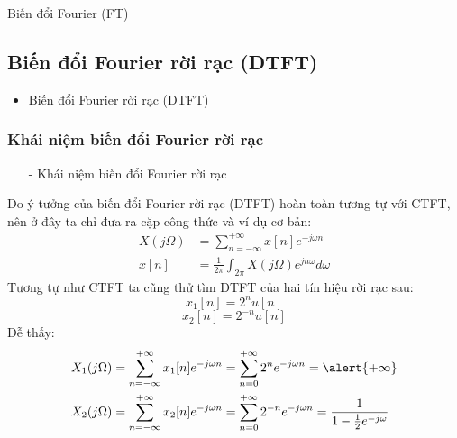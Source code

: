 \documentclass[8pt]{beamer}
\begin{document}
\begin{frame}{Biến đổi Fourier (FT)}
\subsection{Biến đổi Fourier rời rạc (DTFT)}
\begin{itemize}
	\item Biến đổi Fourier rời rạc (DTFT)
\end{itemize}
\subsubsection{Khái niệm biến đổi Fourier rời rạc}
\begin{itemize}
	\item[-] Khái niệm biến đổi Fourier rời rạc
\end{itemize}
Do ý tưởng của biến đổi Fourier rời rạc (DTFT) hoàn toàn tương tự với CTFT, nên ở đây ta chỉ đưa ra cặp công thức và ví dụ cơ bản:
\begin{equation*}
\begin{split}
X(j\Omega)&=\sum_{n=-\infty}^{+\infty}x[n]e^{-j\omega n}\\
x[n]&=\frac{1}{2\pi}\int_{2\pi}X(j\Omega)e^{jn\omega}d\omega
\end{split}
\end{equation*}
Tương tự như CTFT ta cũng thử tìm DTFT của hai tín hiệu rời rạc sau:
$$x_{1}[n]=2^{n}u[n]$$
$$x_{2}[n]=2^{-n}u[n]$$
Dễ thấy:
\begin{equation*}
\begin{split}
	X_{1}(j\Omega)&=\sum_{n=-\infty}^{+\infty}x_{1}[n]e^{-j\omega n}=\sum_{n=0}^{+\infty}2^n e^{-j\omega n}=\alert{+\infty}\\
	X_{2}(j\Omega)&=\sum_{n=-\infty}^{+\infty}x_{2}[n]e^{-j\omega n}=\sum_{n=0}^{+\infty}2^{-n} e^{-j\omega n}=
	\frac{1}{1-\frac{1}{2}e^{-j\omega}}
\end{split}
\end{equation*}
\end{frame}
\end{document}

